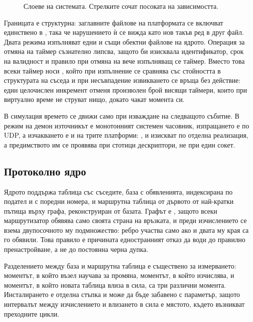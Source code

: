 \begin{figure}[H]
\caption{Слоеве на системата. Стрелките сочат посоката на зависимостта.}
\label{fig:layers}
\end{figure}

Границата е структурна: заглавните файлове на платформата се включват единствено в
, така че нарушението ѝ се вижда като нов такъв ред в друг файл. Двата
режима изпълняват едни и същи обектни файлове на ядрото. Операция за отмяна на таймер
съзнателно липсва, защото би изисквала идентификатор, срок на валидност и правило при отмяна
на вече изпълняващ се таймер. Вместо това всеки таймер носи ,
който при изпълнение се сравнява със стойността в структурата на съседа и при несъвпадение
извикването се връща без действие: един целочислен инкремент отменя произволен брой висящи
таймери, които при виртуално време не струват нищо, докато чакат момента си.

В симулация времето се движи само при изваждане на следващото събитие. В режим на демон
източникът е монотонният системен часовник, изпращането е  по UDP, а изчакването
е  и на трите платформи: ,  и  изискват по
отделна реализация, а предимството им се проявява при стотици дескриптори, не при един сокет.

\subsection{Протоколно ядро}

Ядрото поддържа таблица със съседите, база с обявленията, индексирана по подател и с поредни
номера, и маршрутна таблица от дървото от най-кратки пътища върху графа, реконструиран от
базата. Графът е , защото всеки маршрутизатор обявява само своята страна на
връзката, и преди изчислението се взема двупосочното му подмножество: ребро участва само ако и
двата му края са го обявили. Това правило е причината едностранният отказ да води до правилно
пренастройване, а не до постоянна черна дупка.

Разделението между база и маршрутна таблица е съществено за измерването: моментът, в който
възел научава за промяна, моментът, в който изчислява, и моментът, в който новата таблица
влиза в сила, са три различни момента. Инсталирането е отделна стъпка и може да бъде забавено
с параметър, защото интервалът между изчислението и влизането в сила е мястото, където
възникват преходните цикли.

